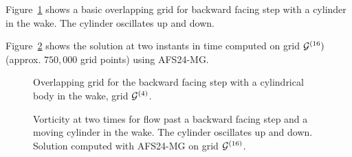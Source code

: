 Figure~\ref{fig:backStepAndBodyGrids} shows a basic overlapping grid for backward facing step
with a cylinder in the wake. The cylinder oscillates up and down. 

Figure~\ref{fig:backStepAndBodyMoveCylinder} shows the solution at two instants in time
computed on grid ${\mathcal G}^{(16})$ (approx. $750,000$ grid points) using AFS24-MG. 
{
\begin{figure}[hbt]
\newcommand{\figWidth}{15cm}
\newcommand{\trimfig}[2]{\trimFigb{#1}{#2}{0.0}{.25}{.27}{.275}}
\begin{center}\small
\caption{
Overlapping grid for the backward facing step with a cylindrical body in the wake, grid ${\mathcal G}^{(4)}$. 
}
\label{fig:backStepAndBodyGrids}
\end{center}
\end{figure}
}

{
\begin{figure}[hbt]
\newcommand{\figWidth}{11cm}
\newcommand{\trimfig}[2]{\trimFigb{#1}{#2}{0.0}{.0}{.27}{.3}}
\begin{center}\small
\caption{
Vorticity at two times for flow past a backward facing step and a moving cylinder in the wake. 
The cylinder oscillates up and down. 
Solution computed with AFS24-MG on grid ${\mathcal G}^{(16)}$.
}
\label{fig:backStepAndBodyMoveCylinder}
\end{center}
\end{figure}
}


